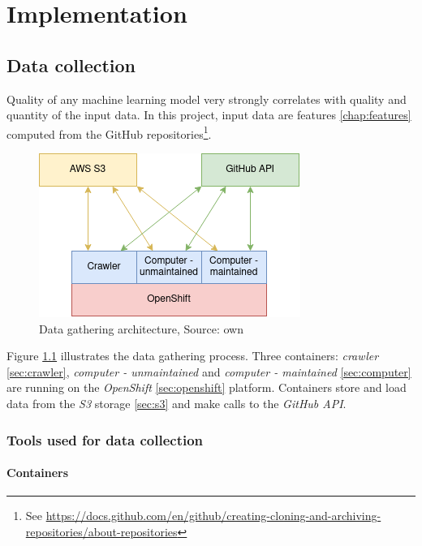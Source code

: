 \chapter{Implementation}
\label{chap-3:implementation}

\section{Data collection}

Quality of any machine learning model very strongly correlates with quality and quantity of the input data.
In this project, input data are features \ref{chap:features} computed from the GitHub repositories\footnote{See \url{https://docs.github.com/en/github/creating-cloning-and-archiving-repositories/about-repositories}}.

\begin{figure}
    \centering
    \includegraphics[scale=0.9]{chapters/chapter3/architecture.png}
    \caption{Data gathering architecture, Source: own}
    \label{fig:architecture}
\end{figure}

Figure \ref{fig:architecture} illustrates the data gathering process.
Three containers: \emph{crawler} \ref{sec:crawler}, \emph{computer - unmaintained} and \emph{computer - maintained} \ref{sec:computer} are running on the \emph{OpenShift} \ref{sec:openshift} platform.
Containers store and load data from the \emph{S3} storage \ref{sec:s3} and make calls to the \emph{GitHub API}.

\subsection{Tools used for data collection}

\subsubsection{Containers}
\label{sec:containers}

